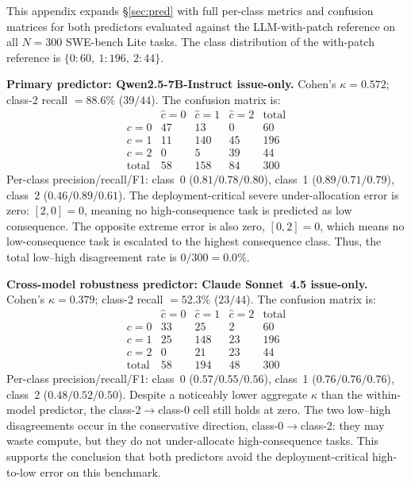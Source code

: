 \documentclass{article}
\begin{document}
This appendix expands \S\ref{sec:pred} with full per-class metrics and
confusion matrices for both predictors evaluated against the
LLM-with-patch reference on all $N{=}300$ SWE-bench Lite tasks. The
class distribution of the with-patch reference is
$\{0{:}60,\ 1{:}196,\ 2{:}44\}$.

\textbf{Primary predictor: Qwen2.5-7B-Instruct issue-only.} Cohen's
$\kappa = 0.572$; class-2 recall $= 88.6\%$ ($39/44$). The confusion
matrix is:
\[
\begin{array}{c|ccc|c}
& \hat{c}{=}0 & \hat{c}{=}1 & \hat{c}{=}2 & \text{total} \\\hline
c{=}0 & 47  & 13  & 0  & 60  \\
c{=}1 & 11  & 140 & 45 & 196 \\
c{=}2 & 0   & 5   & 39 & 44  \\\hline
\text{total} & 58 & 158 & 84 & 300
\end{array}
\]
Per-class precision/recall/F1: class~0 ($0.81/0.78/0.80$), class~1
($0.89/0.71/0.79$), class~2 ($0.46/0.89/0.61$). The deployment-critical severe under-allocation error is zero:
$[2,0]=0$, meaning no high-consequence task is predicted as low
consequence. The opposite extreme error is also zero, $[0,2]=0$,
which means no low-consequence task is escalated to the highest
consequence class. Thus, the total low--high disagreement rate is
$0/300 = 0.0\%$.

\textbf{Cross-model robustness predictor: Claude Sonnet~4.5
issue-only.} Cohen's $\kappa = 0.379$; class-2 recall $= 52.3\%$
($23/44$). The confusion matrix is:
\[
\begin{array}{c|ccc|c}
& \hat{c}{=}0 & \hat{c}{=}1 & \hat{c}{=}2 & \text{total} \\\hline
c{=}0 & 33 & 25 & 2 & 60 \\
c{=}1 & 25 & 148 & 23 & 196 \\
c{=}2 & 0 & 21 & 23 & 44 \\\hline
\text{total} & 58 & 194 & 48 & 300
\end{array}
\]
Per-class precision/recall/F1: class~0 ($0.57/0.55/0.56$), class~1
($0.76/0.76/0.76$), class~2 ($0.48/0.52/0.50$). Despite a noticeably
lower aggregate $\kappa$ than the within-model predictor, the
class-2$\to$class-0 cell still holds at zero. The two low--high
disagreements occur in the conservative direction, class-0$\to$class-2:
they may waste compute, but they do not under-allocate high-consequence
tasks. This supports the conclusion that both predictors avoid the
deployment-critical high-to-low error on this benchmark.
\end{document}
